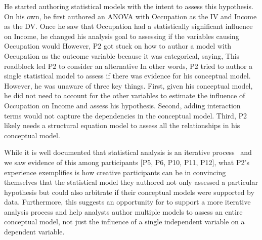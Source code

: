 He started authoring statistical models with the intent to assess this
hypothesis. On his own, he first authored an ANOVA with Occupation as the IV and
Income as the DV. Once he saw that Occupation had a statistically significant
influence on Income, he changed his analysis goal to assessing if the variables
causing Occupation would  However, P2 got stuck on how to author a model
with Occupation as the outcome variable because it was categorical, saying,
 This roadblock led P2 to consider an alternative
 In other words,
P2 tried to author a single statistical model to assess if there was evidence
for his conceptual model. However, he was unaware of three key things. First,
given his conceptual model, he did not need to account for the other variables
to estimate the influence of Occupation on Income and assess his hypothesis.
Second, adding interaction terms would not capture the dependencies in the
conceptual model. Third, P2 likely needs a structural equation model to assess all the relationships in his conceptual model.

While it is well documented that statistical analysis is an iterative
process~\cite{grolemund2014cognitive, jun2022hypoForm} and we saw evidence of
this among participants [P5, P6, P10, P11, P12], what P2's experience
exemplifies is how creative participants can be in convincing themselves that the
statistical model they authored not only assessed a particular hypothesis but
could also arbitrate if their conceptual models were supported by data.
Furthermore, this suggests an opportunity for \rTisane to support a more
iterative analysis process and help analysts author multiple models to assess an
entire conceptual model, not just the influence of a single independent variable
on a dependent variable. 


